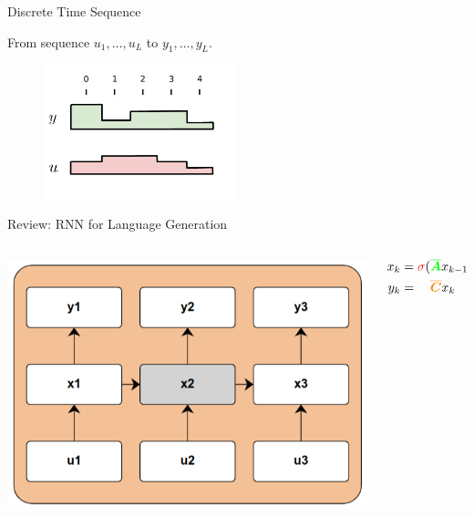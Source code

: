 \begin{frame}{Discrete Time Sequence}

From  sequence $u_{1}, \ldots, u_L$ to $y_1, \ldots, y_L$.

\begin{figure}
    \centering
    \includegraphics[width=0.5\textwidth]{Figs/SSMStart.pdf}
    \label{fig:my_label}
\end{figure}
\end{frame}


\begin{frame}{Review: RNN for Language Generation}
    \begin{columns}
    \begin{column}{0.5\textwidth}
        \centering
              \includegraphics[width=.8\textwidth]{Figs/rnn.png}

    \end{column}
    \begin{column}{0.5\textwidth}

    \begin{align*}
    x_{k} &= \textcolor{red}{\sigma}(\textcolor{green}{\boldsymbol{\overline{A}}} x_{k-1} + \textcolor{blue}{\boldsymbol{\overline{B}}} u_k) \\ 
    y_k &= \phantom{\sigma (} \textcolor{orange}{\boldsymbol{\overline{C}}} x_{k \phantom{- 1}}
    \end{align*}
    \end{column}
    \end{columns}

\end{frame}

